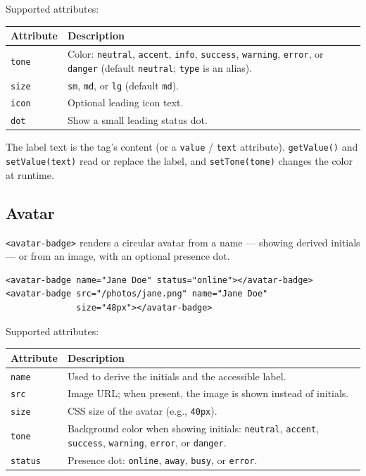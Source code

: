 \noindent
Supported attributes:

\begin{longtable}{P{3.8cm}P{6.7cm}}
\toprule
\textbf{Attribute} & \textbf{Description} \\
\midrule
\endhead
\texttt{tone} & Color: \texttt{neutral}, \texttt{accent}, \texttt{info}, \texttt{success}, \texttt{warning}, \texttt{error}, or \texttt{danger} (default \texttt{neutral}; \texttt{type} is an alias). \\
\texttt{size} & \texttt{sm}, \texttt{md}, or \texttt{lg} (default \texttt{md}). \\
\texttt{icon} & Optional leading icon text. \\
\texttt{dot} & Show a small leading status dot. \\
\bottomrule
\end{longtable}

\noindent
The label text is the tag's content (or a \texttt{value} / \texttt{text} attribute).  \texttt{getValue()} and \texttt{setValue(text)} read or replace the label, and \texttt{setTone(tone)} changes the color at runtime.

\subsection{Avatar}
\label{sec:comp-avatar}

\texttt{<avatar-badge>} renders a circular avatar from a name --- showing derived initials --- or from an image, with an optional presence dot.

\begin{lstlisting}[style=html]
<avatar-badge name="Jane Doe" status="online"></avatar-badge>
<avatar-badge src="/photos/jane.png" name="Jane Doe"
              size="48px"></avatar-badge>
\end{lstlisting}

\noindent
Supported attributes:

\begin{longtable}{P{3.8cm}P{6.7cm}}
\toprule
\textbf{Attribute} & \textbf{Description} \\
\midrule
\endhead
\texttt{name} & Used to derive the initials and the accessible label. \\
\texttt{src} & Image URL; when present, the image is shown instead of initials. \\
\texttt{size} & CSS size of the avatar (e.g., \texttt{40px}). \\
\texttt{tone} & Background color when showing initials: \texttt{neutral}, \texttt{accent}, \texttt{success}, \texttt{warning}, \texttt{error}, or \texttt{danger}. \\
\texttt{status} & Presence dot: \texttt{online}, \texttt{away}, \texttt{busy}, or \texttt{error}. \\
\bottomrule
\end{longtable}

